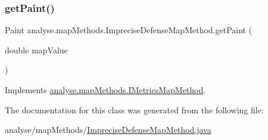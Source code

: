 \subsubsection{\texorpdfstring{get\+Paint()}{getPaint()}}
{\footnotesize\ttfamily Paint analyse.\+map\+Methods.\+Imprecise\+Defense\+Map\+Method.\+get\+Paint (\begin{DoxyParamCaption}\item[{double}]{map\+Value }\end{DoxyParamCaption})\hspace{0.3cm}{\ttfamily [inline]}}



Implements \mbox{\hyperlink{interfaceanalyse_1_1map_methods_1_1_i_metrics_map_method_a102909023c32cebe3bc75052f55b24a0}{analyse.\+map\+Methods.\+I\+Metrics\+Map\+Method}}.



The documentation for this class was generated from the following file\+:\begin{DoxyCompactItemize}
\item 
analyse/map\+Methods/\mbox{\hyperlink{_imprecise_defense_map_method_8java}{Imprecise\+Defense\+Map\+Method.\+java}}\end{DoxyCompactItemize}
